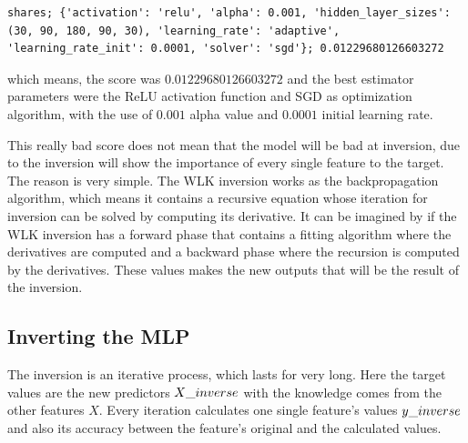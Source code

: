 \begin{lstlisting}
shares; {'activation': 'relu', 'alpha': 0.001, 'hidden_layer_sizes': (30, 90, 180, 90, 30), 'learning_rate': 'adaptive', 'learning_rate_init': 0.0001, 'solver': 'sgd'}; 0.01229680126603272
\end{lstlisting}
which means, the score was $0.01229680126603272$ and the best estimator parameters were the ReLU activation function and SGD as optimization algorithm, with the use of $0.001$ alpha value and $0.0001$ initial learning rate. \medskip

This really bad score does not mean that the model will be bad at inversion, due to the inversion will show the importance of every single feature to the target. The reason is very simple. The WLK inversion works as the backpropagation algorithm, which means it contains a recursive equation whose iteration for inversion can be solved by computing its derivative. It can be imagined by if the WLK inversion has a forward phase that contains a fitting algorithm where the derivatives are computed and a backward phase where the recursion is computed by the derivatives. These values makes the new outputs that will be the result of the inversion.


\subsection{Inverting the MLP}


The inversion is an iterative process, which lasts for very long. Here the target values are the new predictors $X\char`_inverse$ with the knowledge comes from the other features $X$. Every iteration calculates one single feature's values $y\char`_inverse$ and also its accuracy between the feature's original and the calculated values. \medskip

